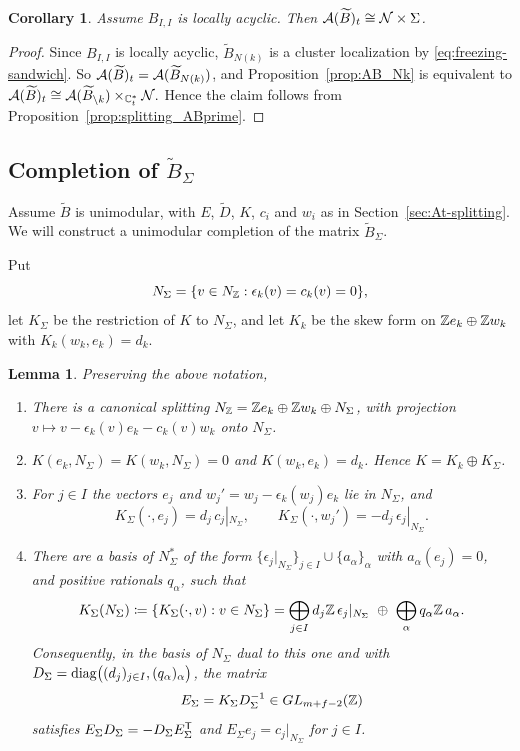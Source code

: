 \documentclass[12pt, letter]{amsart}
\newtheorem{lemma}[dummy]{Lemma}
\newtheorem{corollary}[dummy]{Corollary}
\theoremstyle{definition}
\begin{document}
\begin{corollary}
\label{cor:At-splitting} 
Assume \(B_{I, I}\) is locally acyclic. Then
 $\mathcal{A}(\widetilde B)_t\cong\mathcal{N}\times\Sigma$.
\end{corollary}
\begin{proof}
Since $B_{I,I}$ is locally acyclic, $\widetilde B_{N(k)}$ is a cluster localization by \eqref{eq:freezing-sandwich}.
So $\mathcal{A}(\widetilde B)_t=\mathcal{A}(\widetilde B_{N(k)})$, and Proposition~\ref{prop:AB_Nk} is equivalent to
$
\mathcal{A}(\widetilde B)_t \cong \mathcal{A}( \widetilde B_{\setminus k} ) \times_{\mathbb{C}^*_t} \mathcal{N} .
$
Hence the claim follows from Proposition~\ref{prop:splitting_ABprime}. 
\end{proof}

\subsection{Completion of \(\widetilde B_\Sigma\)}

Assume $\widetilde B$ is unimodular, with $E$, $\widetilde D$, $K$, $c_i$ and $w_i$ as in Section~\ref{sec:At-splitting}.  We will construct a unimodular completion of the matrix $\widetilde B_\Sigma$. 


Put
\[
 N_\Sigma=\{v\in N_{\mathbb{Z}}:\epsilon_k(v)=c_k(v)=0\},
\]
let $K_\Sigma$ be the restriction of $K$ to $N_\Sigma$, and let $K_k$ be the skew form on $\mathbb{Z} e_k\oplus\mathbb{Z} w_k$ with $K_k(w_k,e_k)=d_k$.



\begin{lemma}\label{lem:lattice-splitting}
Preserving the above notation, 
\begin{enumerate}[label=\textup{(\roman*)}]
\item There is a canonical splitting $N_{\mathbb{Z}}=\mathbb{Z} e_k\oplus\mathbb{Z} w_k\oplus N_\Sigma$, with projection $v\mapsto v-\epsilon_k(v)e_k-c_k(v)w_k$ onto $N_\Sigma$.
\item $K(e_k,N_\Sigma)=K(w_k,N_\Sigma)=0$ and $K(w_k,e_k)=d_k$.
Hence $K=K_k\oplus K_\Sigma$.
\item For $j\in I$ the vectors $e_j$ and $w_j'=w_j-\epsilon_k(w_j)e_k$ lie in $N_\Sigma$, and
\begin{equation}\label{eq:residual-pairing}
 K_\Sigma(\cdot,e_j)=d_j\,c_j|_{N_\Sigma},\qquad K_\Sigma(\cdot,w_j')=-d_j\,\epsilon_j|_{N_\Sigma}.
\end{equation}
\item There are a basis of $N_\Sigma^*$ of the form $\{\epsilon_j|_{N_\Sigma}\}_{j\in I}\cup\{a_\alpha\}_\alpha$ with $a_\alpha(e_j)=0$, and positive rationals $q_\alpha$, such that
\[
K_\Sigma(N_\Sigma)\coloneqq\{K_\Sigma(\cdot,v):v\in N_\Sigma\}=\bigoplus_{j\in I}d_j\bZ\,\epsilon_j|_{N_\Sigma}\ \oplus\ \bigoplus_\alpha q_\alpha\bZ\,a_\alpha .
\]
Consequently, in the basis of $N_\Sigma$ dual to this one and with $D_\Sigma=\operatorname{diag}\bigl((d_j)_{j\in I},(q_\alpha)_\alpha\bigr)$, the matrix
\[
 E_\Sigma=K_\Sigma D_\Sigma^{-1}\in GL_{m+f-2}(\mathbb{Z})
\]
satisfies $E_\Sigma D_\Sigma=-D_\Sigma E_\Sigma^{\mathsf T}$ and $E_\Sigma e_j=c_j|_{N_\Sigma}$ for $j\in I$.
\end{enumerate}
\end{lemma}
\end{document}
